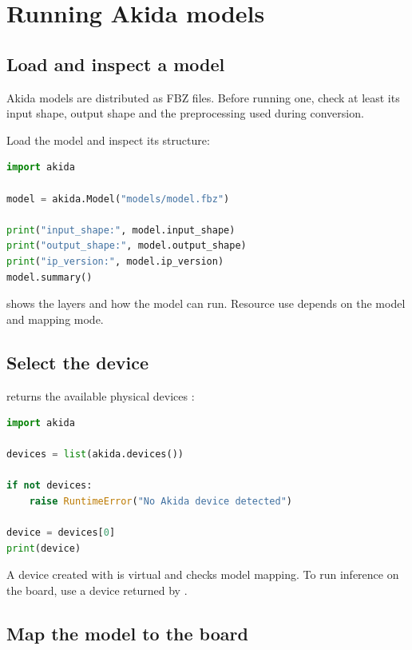 \chapter{Running Akida models}
\label{chap:operacion}

\section{Load and inspect a model}

Akida models are distributed as FBZ files. Before running one, check at least its
input shape, output shape and the preprocessing used during conversion.

Load the model and inspect its structure:

\begin{lstlisting}[language=Python]
import akida

model = akida.Model("models/model.fbz")

print("input_shape:", model.input_shape)
print("output_shape:", model.output_shape)
print("ip_version:", model.ip_version)
model.summary()
\end{lstlisting}

 shows the layers and how the model can run. Resource use depends
on the model and mapping mode.

\section{Select the device}

 returns the available physical devices \cite{brainchip_akida_guide}:

\begin{lstlisting}[language=Python]
import akida

devices = list(akida.devices())

if not devices:
    raise RuntimeError("No Akida device detected")

device = devices[0]
print(device)
\end{lstlisting}

A device created with  is virtual and checks model mapping.
To run inference on the board, use a device returned by .

\section{Map the model to the board}

